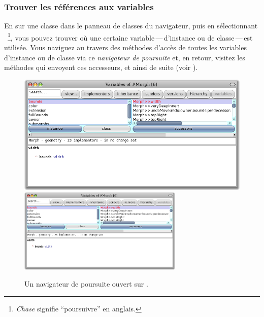 \documentclass[a4paper,10pt,twoside]{book}
\begin{document}
\subsubsection{Trouver les références aux variables}

En \actclickant sur une classe dans le panneau de classes du
navigateur, puis en sélectionnant
~\footnote{\emph{Chase} signifie
  ``poursuivre'' en anglais.}, vous pouvez trouver 
où une certaine variable\,---\,d'instance ou de classe\,---\,est
utilisée.
Vous naviguez au travers des méthodes d'accès de toutes les variables
d'instance ou de classe via ce \emph{navigateur de poursuite} et, en
retour, visitez les méthodes qui envoyent ces accesseurs, et
ainsi de suite (voir ).

\begin{figure}[btp]
	\begin{center}
	\ifluluelse
		{\includegraphics[width=\textwidth]{chasingBrowser}}
		{\includegraphics[width=0.7\textwidth]{chasingBrowser}}
	\end{center}
	\caption{Un navigateur de poursuite ouvert sur .}
\end{figure}

\end{document}
